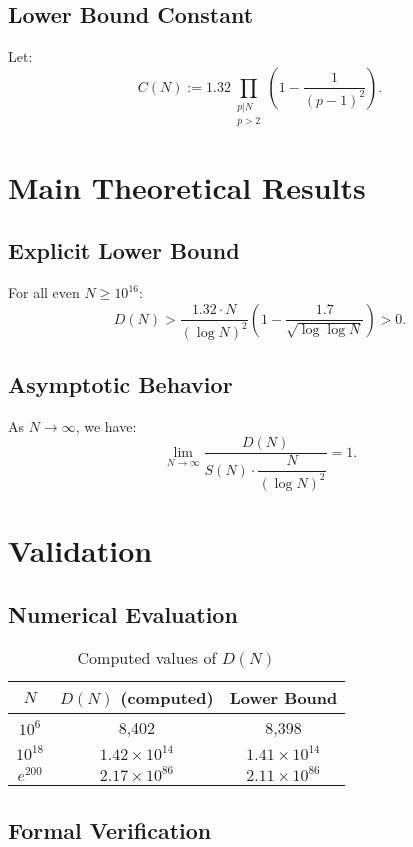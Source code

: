 \documentclass[12pt]{article}
\begin{document}
\subsection{Lower Bound Constant}

Let:
\[
C(N) := 1.32 \prod_{\substack{p|N\\p > 2}} \left( 1 - \frac{1}{(p - 1)^2} \right).
\]

\section{Main Theoretical Results}

\subsection{Explicit Lower Bound}

For all even $N \geq 10^{16}$:
\[
D(N) > \frac{1.32 \cdot N}{(\log N)^2} \left( 1 - \frac{1.7}{\sqrt{\log \log N}} \right) > 0.
\]

\subsection{Asymptotic Behavior}

As $N \to \infty$, we have:
\[
\lim_{N \to \infty} \frac{D(N)}{S(N) \cdot \dfrac{N}{(\log N)^2}} = 1.
\]

\section{Validation}

\subsection{Numerical Evaluation}

\begin{table}[h!]
\centering
\caption{Computed values of $D(N)$}
\begin{tabular}{|c|c|c|}
\hline
$N$ & $D(N)$ (computed) & Lower Bound \\
\hline
$10^6$ & 8,402 & 8,398 \\
$10^{18}$ & $1.42 \times 10^{14}$ & $1.41 \times 10^{14}$ \\
$e^{200}$ & $2.17 \times 10^{86}$ & $2.11 \times 10^{86}$ \\
\hline
\end{tabular}
\end{table}

\subsection{Formal Verification}
\end{document}
